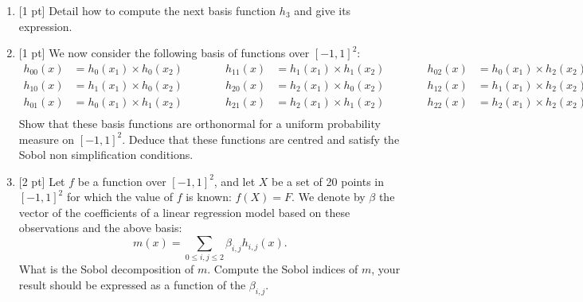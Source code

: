 \documentclass[a4paper,10pt]{article}
\begin{document}
\begin{enumerate}[label=Q\arabic*.]
\item {[1 pt]} Detail how to compute the next basis function $h_3$ and give its expression.
\item {[1 pt]} We now consider the following basis of functions over $[-1,1]^2$: 
\begin{equation*}
  \begin{split}
    h_{00}(x) & = h_{0}(x_1) \times h_{0}(x_2) \\
    h_{10}(x) & = h_{1}(x_1)\times h_{0}(x_2)\\
    h_{01}(x) & = h_{0}(x_1) \times h_{1}(x_2) \\
  \end{split}
  \qquad \quad
  \begin{split}
    h_{11}(x) & = h_{1}(x_1) \times h_{1}(x_2) \\
    h_{20}(x) & = h_{2}(x_1)\times h_{0}(x_2) \\
    h_{21}(x) & = h_{2}(x_1)\times h_{1}(x_2) \\
  \end{split}
  \qquad \quad
  \begin{split}
    h_{02}(x) & = h_{0}(x_1) \times h_{2}(x_2) \\
    h_{12}(x) & = h_{1}(x_1)\times h_{2}(x_2) \\
    h_{22}(x) & = h_{2}(x_1)\times h_{2}(x_2) \\
  \end{split}
\end{equation*}
Show that these basis functions are orthonormal for a uniform probability measure on $[-1,1]^2$. Deduce that these functions are centred and satisfy the Sobol non simplification conditions.
\item {[2 pt]} Let $f$ be a function over $[-1,1]^2$, and let $X$ be a set of 20 points in $[-1,1]^2$ for which the value of $f$ is known: $f(X)=F$. We denote by $\beta$ the vector of the coefficients of a linear regression model based on these observations and the above basis:
\begin{equation*}
 m(x) = \sum_{0 \leq i,j \leq 2} \beta_{i,j} h_{i,j}(x).
\end{equation*}
What is the Sobol decomposition of $m$. Compute the Sobol indices of $m$, your result should be expressed as a function of the $\beta_{i,j}$.
\end{enumerate}

\newpage
\end{document}
